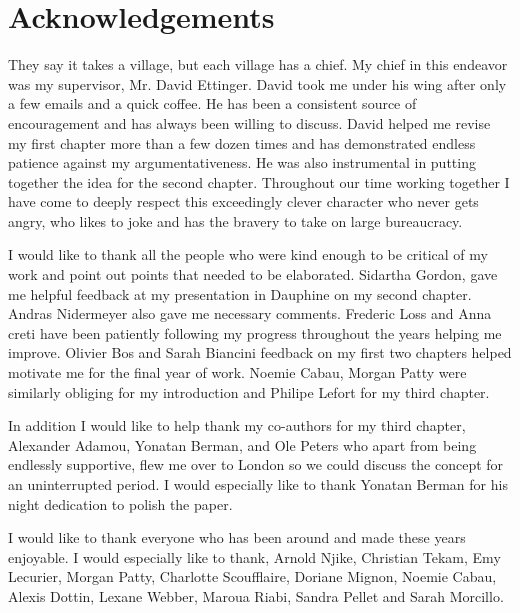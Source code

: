 \documentclass[12pt,twoside]{report}
\numberwithin{equation}{section}
\begin{document}


 
 
\chapter*{Acknowledgements}
They say it takes a village, but each village has a chief. My chief in this endeavor was my supervisor, Mr. David Ettinger. David took me under his wing after only a few emails and a quick coffee. He has been a consistent source of encouragement and has always been willing to discuss. David helped me revise my first chapter more than a few dozen times and has demonstrated endless patience against my argumentativeness. He was also instrumental in putting together the idea for the second chapter. Throughout our time working together I have come to deeply respect this exceedingly clever character who never gets angry, who likes to joke and has the bravery to take on large bureaucracy.

I would like to thank all the people who were kind enough to be critical of my work and point out points that needed to be elaborated. Sidartha Gordon, gave me helpful feedback at my presentation in Dauphine on my second chapter. Andras Nidermeyer also gave me necessary comments. Frederic Loss and Anna creti have been patiently following my progress throughout the years helping me improve. Olivier Bos and Sarah Biancini feedback on my first two chapters helped motivate me for the final year of work. Noemie Cabau, Morgan Patty were similarly obliging for my introduction and Philipe Lefort for my third chapter. 

In addition I would like to help thank my co-authors for my third chapter, Alexander Adamou, Yonatan Berman, and Ole Peters who apart from being endlessly supportive, flew me over to London so we could discuss the concept for an uninterrupted period. I would especially like to thank Yonatan Berman for his night dedication to polish the paper.

I would like to thank everyone who has been around and made these years enjoyable. I would especially like to thank, Arnold Njike, Christian Tekam, Emy Lecurier, Morgan Patty, Charlotte Scoufflaire, Doriane Mignon, Noemie Cabau, Alexis Dottin, Lexane Webber, Maroua Riabi, Sandra Pellet and Sarah Morcillo. 
\end{document}
